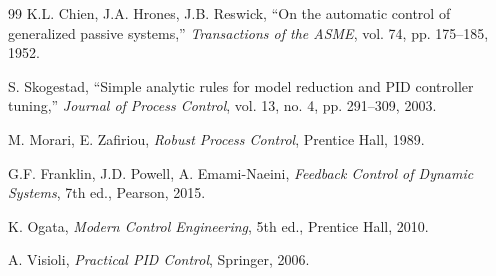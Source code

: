\documentclass[11pt,a4paper]{article}
\begin{document}
\begin{thebibliography}{99}
K.L. Chien, J.A. Hrones, J.B. Reswick,
``On the automatic control of generalized passive systems,''
\textit{Transactions of the ASME}, vol. 74, pp. 175--185, 1952.

S. Skogestad,
``Simple analytic rules for model reduction and PID controller tuning,''
\textit{Journal of Process Control}, vol. 13, no. 4, pp. 291--309, 2003.

M. Morari, E. Zafiriou,
\textit{Robust Process Control},
Prentice Hall, 1989.

G.F. Franklin, J.D. Powell, A. Emami-Naeini,
\textit{Feedback Control of Dynamic Systems},
7th ed., Pearson, 2015.

K. Ogata,
\textit{Modern Control Engineering},
5th ed., Prentice Hall, 2010.

A. Visioli,
\textit{Practical PID Control},
Springer, 2006.

\end{thebibliography}
\end{document}

